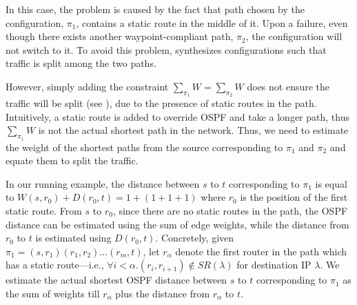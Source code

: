 In this case, the problem is caused by the fact that
path chosen by the configuration, $\pi_1$,
contains a static route in the middle of it.
Upon a failure, even though there exists another
waypoint-compliant path, $\pi_2$, the configuration will not switch to it.
To avoid this problem, 
\name synthesizes 
configurations such that traffic is split among the two paths.

However, simply  adding
the constraint $\sum_{\pi_1} W= \sum_{\pi_2}W$ does not ensure the 
traffic will be split (see ), due to the 
presence of static routes in the path. Intuitively, a static route
is added to override OSPF and take a longer path, thus $\sum_{\pi_1}W$
is not the actual shortest path in the network. Thus, we need to estimate 
the weight of the shortest paths from the source 
corresponding to $\pi_1$ and $\pi_2$ and 
equate them to split the traffic.

 In our running example,  
 the distance between $s$ to $t$ corresponding
 to $\pi_1$ is equal to 
 $W(s, r_0) + D(r_0, t) = 1 + (1 + 1 + 1)$ where $r_0$
 is the position of the first static route. From $s$ to 
 $r_0$, since there are no static routes in the path, the  
 OSPF distance can be estimated using the sum of edge weights,
 while the distance from $r_0$ to $t$ is estimated using $D(r_0, t)$.
 Concretely, given $\pi_1 = (s, r_1)(r_1, r_2) \ldots (r_m, t)$, let 
 $r_\alpha$ denote the first router in the path which has a static route---i.e., 
 $\forall i < \alpha. (r_i, r_{i+1}) \not\in SR(\lambda)$ for destination IP $\lambda$.
 We estimate
 the actual shortest OSPF distance  
 between $s$ to $t$ 
 corresponding to $\pi_1$ 
 as the sum of weights till $r_\alpha$ plus the distance
 from $r_\alpha$ to $t$. 
 
